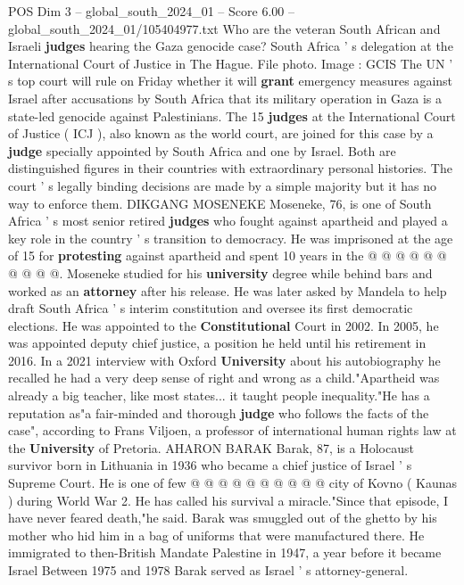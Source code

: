 \begin{textsample}{POS Dim 3 – global\_south\_2024\_01 – Score 6.00 – global\_south\_2024\_01/105404977.txt}  \label{ex:f3_pos_351}
Who are the veteran South African and Israeli \textbf{judges} hearing the Gaza genocide case?
South Africa ' s delegation at the International Court of Justice in The Hague.
File photo.
Image : GCIS The UN ' s top court will rule on Friday whether it will \textbf{grant} emergency measures against Israel after accusations by South Africa that its military operation in Gaza is a state-led genocide against Palestinians.
The 15 \textbf{judges} at the International Court of Justice ( ICJ ), also known as the world court, are joined for this case by a \textbf{judge} specially appointed by South Africa and one by Israel.
Both are distinguished figures in their countries with extraordinary personal histories.
The court ' s legally binding decisions are made by a simple majority but it has no way to enforce them.
DIKGANG MOSENEKE Moseneke, 76, is one of South Africa ' s most senior retired \textbf{judges} who fought against apartheid and played a key role in the country ' s transition to democracy.
He was imprisoned at the age of 15 for \textbf{protesting} against apartheid and spent 10 years in the @ @ @ @ @ @ @ @ @ @.
Moseneke studied for his \textbf{university} degree while behind bars and worked as an \textbf{attorney} after his release.
He was later asked by Mandela to help draft South Africa ' s interim constitution and oversee its first democratic elections.
He was appointed to the \textbf{Constitutional} Court in 2002.
In 2005, he was appointed deputy chief justice, a position he held until his retirement in 2016.
In a 2021 interview with Oxford \textbf{University} about his autobiography he recalled he had a very deep sense of right and wrong as a child."Apartheid was already a big teacher, like most states... it taught people inequality."He has a reputation as"a fair-minded and thorough \textbf{judge} who follows the facts of the case", according to Frans Viljoen, a professor of international human rights law at the \textbf{University} of Pretoria.
AHARON BARAK Barak, 87, is a Holocaust survivor born in Lithuania in 1936 who became a chief justice of Israel ' s Supreme Court.
He is one of few @ @ @ @ @ @ @ @ @ @ city of Kovno ( Kaunas ) during World War 2.
He has called his survival a miracle."Since that episode, I have never feared death,"he said.
Barak was smuggled out of the ghetto by his mother who hid him in a bag of uniforms that were manufactured there.
He immigrated to then-British Mandate Palestine in 1947, a year before it became Israel Between 1975 and 1978 Barak served as Israel ' s attorney-general.

\end{textsample}
